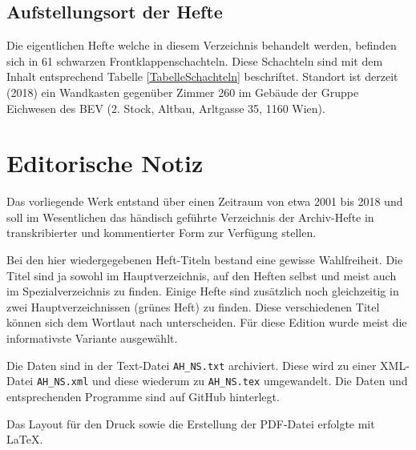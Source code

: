 \documentclass[a4paper]{scrbook}
\begin{document}
\section{Aufstellungsort der Hefte}

Die eigentlichen Hefte welche in diesem Verzeichnis behandelt werden, befinden sich in 61 schwarzen Frontklappenschachteln. Diese Schachteln sind mit dem Inhalt entsprechend Tabelle \ref{TabelleSchachteln}{} beschriftet. Standort ist derzeit (2018) ein Wandkasten gegenüber Zimmer 260  im Gebäude der Gruppe Eichwesen des BEV (2. Stock, Altbau, Arltgasse 35, 1160 Wien).






\chapter{Editorische Notiz}
Das vorliegende Werk entstand über einen Zeitraum von etwa 2001 bis 2018 und soll im Wesentlichen das händisch geführte Verzeichnis der Archiv-Hefte in transkribierter und kommentierter Form zur Verfügung stellen.

Bei den hier wiedergegebenen Heft-Titeln bestand eine gewisse Wahlfreiheit. Die Titel sind ja sowohl im Hauptverzeichnis, auf den Heften selbst und meist auch im Spezialverzeichnis zu finden. Einige Hefte sind zusätzlich noch gleichzeitig in zwei Hauptverzeichnissen (\glqq{}grünes Heft\grqq{}) zu finden. Diese verschiedenen Titel können sich dem Wortlaut nach unterscheiden. Für diese Edition wurde meist die informativste Variante ausgewählt.

Die Daten sind in der Text-Datei \texttt{AH\_NS.txt} archiviert. Diese wird zu einer XML-Datei \texttt{AH\_NS.xml} und diese wiederum zu \texttt{AH\_NS.tex} umgewandelt. Die Daten und entsprechenden Programme sind auf GitHub hinterlegt.

Das Layout für den Druck sowie die Erstellung der PDF-Datei erfolgte mit \LaTeX.
\end{document}
